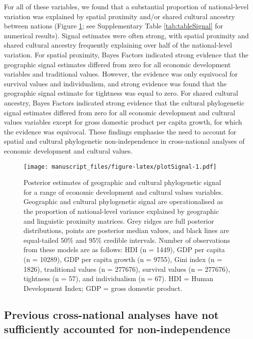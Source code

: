 \documentclass[
  man,floatsintext]{apa6}
\begin{document}
For all of these variables, we found that a substantial proportion of national-level variation was explained by spatial proximity and/or shared cultural ancestry between nations (Figure \ref{fig:plotSignal}; see Supplementary Table \ref{tab:tableSignal} for numerical results). Signal estimates were often strong, with spatial proximity and shared cultural ancestry frequently explaining over half of the national-level variation. For spatial proximity, Bayes Factors indicated strong evidence that the geographic signal estimates differed from zero for all economic development variables and traditional values. However, the evidence was only equivocal for survival values and individualism, and strong evidence was found that the geographic signal estimate for tightness was equal to zero. For shared cultural ancestry, Bayes Factors indicated strong evidence that the cultural phylogenetic signal estimates differed from zero for all economic development and cultural values variables except for gross domestic product per capita growth, for which the evidence was equivocal. These findings emphasise the need to account for spatial and cultural phylogenetic non-independence in cross-national analyses of economic development and cultural values.



\begin{figure}
\centering
\texttt{[image: manuscript\_files/figure-latex/plotSignal-1.pdf]}
\caption{\label{fig:plotSignal}Posterior estimates of geographic and cultural phylogenetic signal for a range of economic development and cultural values variables. Geographic and cultural phylogenetic signal are operationalised as the proportion of national-level variance explained by geographic and linguistic proximity matrices. Grey ridges are full posterior distributions, points are posterior median values, and black lines are equal-tailed 50\% and 95\% credible intervals. Number of observations from these models are as follows: HDI (n = 1449), GDP per capita (n = 10289), GDP per capita growth (n = 9755), Gini index (n = 1826), traditional values (n = 277676), survival values (n = 277676), tightness (n = 57), and individualism (n = 67). HDI = Human Development Index; GDP = gross domestic product.}
\end{figure}

\hypertarget{previous-cross-national-analyses-have-not-sufficiently-accounted-for-non-independence}{%
\subsection{Previous cross-national analyses have not sufficiently accounted for non-independence}\label{previous-cross-national-analyses-have-not-sufficiently-accounted-for-non-independence}}
\end{document}
